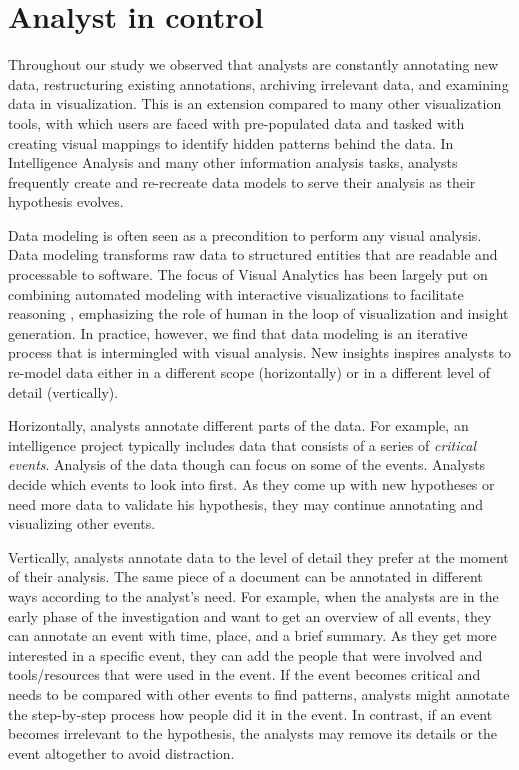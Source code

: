 \section{Analyst in control}

Throughout our study we observed that analysts are constantly annotating new data, restructuring existing annotations, archiving irrelevant data, and examining data in visualization. This is an extension compared to many other visualization tools, with which users are faced with pre-populated data and tasked with creating visual mappings to identify hidden patterns behind the data. In Intelligence Analysis and many other information analysis tasks, analysts frequently create and re-recreate data models to serve their analysis as their hypothesis evolves.

Data modeling is often seen as a precondition to perform any visual analysis. Data modeling transforms raw data to structured entities that are readable and processable to software. The focus of Visual Analytics has been largely put on combining automated modeling with interactive visualizations to facilitate reasoning \citep{Keim2010}, emphasizing the role of human in the loop of visualization and insight generation. In practice, however, we find that data modeling is an iterative process that is intermingled with visual analysis. New insights inspires analysts to re-model data either in a different scope (horizontally) or in a different level of detail (vertically). 

Horizontally, analysts annotate different parts of the data. For example, an intelligence project typically includes data that consists of a series of \textit{critical events}. Analysis of the data though can focus on some of the events. Analysts decide which events to look into first. As they come up with new hypotheses or need more data to validate his hypothesis, they may continue annotating and visualizing other events.

Vertically, analysts annotate data to the level of detail they prefer at the moment of their analysis. The same piece of a document can be annotated in different ways according to the analyst's need. For example, when the analysts are in the early phase of the investigation and want to get an overview of all events, they can annotate an event with time, place, and a brief summary. As they get more interested in a specific event, they can add the people that were involved and tools/resources that were used in the event. If the event becomes critical and needs to be compared with other events to find patterns, analysts might annotate the step-by-step process how people did it in the event. In contrast, if an event becomes irrelevant to the hypothesis, the analysts may remove its details or the event altogether to avoid distraction. 


